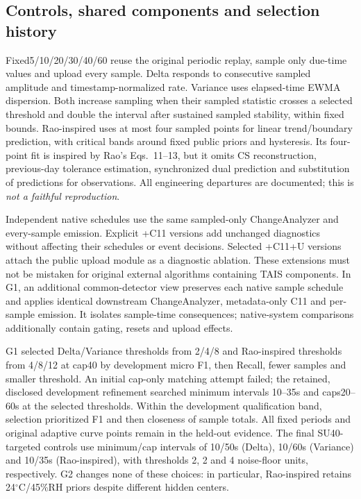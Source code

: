 \documentclass[10pt]{article}
\begin{document}
\subsection{Controls, shared components and selection history}
Fixed5/10/20/30/40/60 reuse the original periodic replay, sample only due-time values and upload every sample. Delta responds to consecutive sampled amplitude and timestamp-normalized rate. Variance uses elapsed-time EWMA dispersion. Both increase sampling when their sampled statistic crosses a selected threshold and double the interval after sustained sampled stability, within fixed bounds. Rao-inspired uses at most four sampled points for linear trend/boundary prediction, with critical bands around fixed public priors and hysteresis. Its four-point fit is inspired by Rao's Eqs.~11--13, but it omits CS reconstruction, previous-day tolerance estimation, synchronized dual prediction and substitution of predictions for observations. All engineering departures are documented; this is \emph{not a faithful reproduction}.

Independent native schedules use the same sampled-only ChangeAnalyzer and every-sample emission. Explicit +C11 versions add unchanged diagnostics without affecting their schedules or event decisions. Selected +C11+U versions attach the public upload module as a diagnostic ablation. These extensions must not be mistaken for original external algorithms containing TAIS components. In G1, an additional common-detector view preserves each native sample schedule and applies identical downstream ChangeAnalyzer, metadata-only C11 and per-sample emission. It isolates sample-time consequences; native-system comparisons additionally contain gating, resets and upload effects.

G1 selected Delta/Variance thresholds from 2/4/8 and Rao-inspired thresholds from 4/8/12 at cap40 by development micro F1, then Recall, fewer samples and smaller threshold. An initial cap-only matching attempt failed; the retained, disclosed development refinement searched minimum intervals 10--35s and caps20--60s at the selected thresholds. Within the development qualification band, selection prioritized F1 and then closeness of sample totals. All fixed periods and original adaptive curve points remain in the held-out evidence. The final SU40-targeted controls use minimum/cap intervals of 10/50s (Delta), 10/60s (Variance) and 10/35s (Rao-inspired), with thresholds 2, 2 and 4 noise-floor units, respectively. G2 changes none of these choices: in particular, Rao-inspired retains 24$^\circ$C/45\%RH priors despite different hidden centers.
\end{document}
